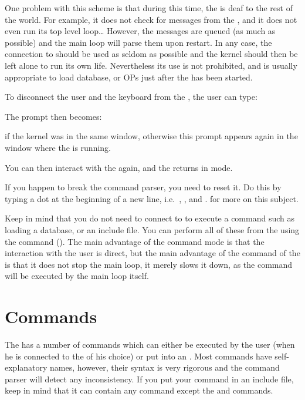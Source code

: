 One problem with this scheme is that during this time, the \CPK{} is deaf to
the rest of the world. For example, it does not check for messages from the
\MPA{}, and it does not even run its top level loop\dots{} However, the messages
are queued (as much as possible) and the main loop will parse them upon
restart.  In any case, the connection to \aCPK{} should be used as seldom as
possible and the kernel should then be left alone to run its own life.
Nevertheless its use is not prohibited, and is usually appropriate to load
database, or OPs just after the \CPK{} has been started.

To disconnect the user and the keyboard from the \CPK{}, the user can
type:


The prompt then becomes:


if the kernel was in the same window, otherwise this prompt appears again
in the window where the \OPRSS{} is running.

You can then interact with the \OPRSS{} again, and the \CPK{} returns in
 mode.

If you happen to break the command parser, you need to reset it. Do this by typing a dot 
 at the beginning of a new line, i.e.\ ,
, and .  for more on this subject.

Keep in mind that you do not need to connect to \aCPK{} to execute a command
such as loading a database, or an include file. You can perform all of these
from the \OPRSS{} using the  command (). The main advantage of the command mode is that the
interaction with the user is direct, but the main advantage of the
 command of the \OPRSS{} is that it does not stop the \CPK{}
main loop, it merely slows it down, as the command will be executed by the main
loop itself.

\chapter{\CPK{} Commands}

The \CPK{} has a number of commands which can either be executed by the
user (when he is connected to the \CPK{} of his choice) or put into an
. Most commands have self-explanatory names,
however, their syntax is very rigorous and the command parser will detect any
inconsistency. If you put your command in an include file, keep in mind that it
can contain any command except the  and 
commands.

